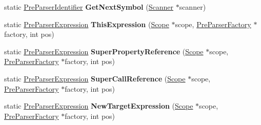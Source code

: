 \begin{DoxyCompactItemize}
\item 
static \hyperlink{classv8_1_1internal_1_1_pre_parser_identifier}{Pre\+Parser\+Identifier} {\bfseries Get\+Next\+Symbol} (\hyperlink{classv8_1_1internal_1_1_scanner}{Scanner} $\ast$scanner)\hypertarget{classv8_1_1internal_1_1_pre_parser_traits_a1ac8d99696da0496bea8d444ec1af505}{}\label{classv8_1_1internal_1_1_pre_parser_traits_a1ac8d99696da0496bea8d444ec1af505}

\item 
static \hyperlink{classv8_1_1internal_1_1_pre_parser_expression}{Pre\+Parser\+Expression} {\bfseries This\+Expression} (\hyperlink{classv8_1_1internal_1_1_scope}{Scope} $\ast$scope, \hyperlink{classv8_1_1internal_1_1_pre_parser_factory}{Pre\+Parser\+Factory} $\ast$factory, int pos)\hypertarget{classv8_1_1internal_1_1_pre_parser_traits_aa645af5c4278ab67da26de7d83cad685}{}\label{classv8_1_1internal_1_1_pre_parser_traits_aa645af5c4278ab67da26de7d83cad685}

\item 
static \hyperlink{classv8_1_1internal_1_1_pre_parser_expression}{Pre\+Parser\+Expression} {\bfseries Super\+Property\+Reference} (\hyperlink{classv8_1_1internal_1_1_scope}{Scope} $\ast$scope, \hyperlink{classv8_1_1internal_1_1_pre_parser_factory}{Pre\+Parser\+Factory} $\ast$factory, int pos)\hypertarget{classv8_1_1internal_1_1_pre_parser_traits_a02a59924530c432e9273d6d48f1913ed}{}\label{classv8_1_1internal_1_1_pre_parser_traits_a02a59924530c432e9273d6d48f1913ed}

\item 
static \hyperlink{classv8_1_1internal_1_1_pre_parser_expression}{Pre\+Parser\+Expression} {\bfseries Super\+Call\+Reference} (\hyperlink{classv8_1_1internal_1_1_scope}{Scope} $\ast$scope, \hyperlink{classv8_1_1internal_1_1_pre_parser_factory}{Pre\+Parser\+Factory} $\ast$factory, int pos)\hypertarget{classv8_1_1internal_1_1_pre_parser_traits_a7b9ae5061019f0576aaf8733d980109e}{}\label{classv8_1_1internal_1_1_pre_parser_traits_a7b9ae5061019f0576aaf8733d980109e}

\item 
static \hyperlink{classv8_1_1internal_1_1_pre_parser_expression}{Pre\+Parser\+Expression} {\bfseries New\+Target\+Expression} (\hyperlink{classv8_1_1internal_1_1_scope}{Scope} $\ast$scope, \hyperlink{classv8_1_1internal_1_1_pre_parser_factory}{Pre\+Parser\+Factory} $\ast$factory, int pos)\hypertarget{classv8_1_1internal_1_1_pre_parser_traits_a1e24803ac74e973017279dec34c89f3e}{}\label{classv8_1_1internal_1_1_pre_parser_traits_a1e24803ac74e973017279dec34c89f3e}


\end{DoxyCompactItemize}
